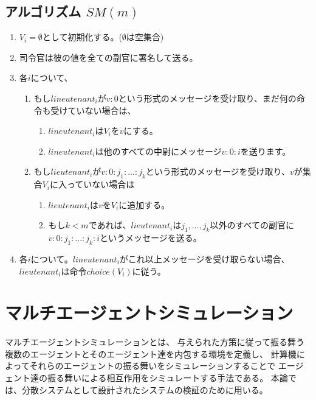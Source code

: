 \subsection{アルゴリズム $SM(m)$}
\begin{enumerate}
  \item $V_i=\emptyset$として初期化する。($\emptyset$は空集合)
  \item 司令官は彼の値を全ての副官に署名して送る。
  \item 各$i$について、 
  \begin{enumerate}
    \item もし$lineutenant_i$が$v:0$という形式のメッセージを受け取り、まだ何の命令も受けていない場合は、
    \begin{enumerate}
      \item $lineutenant_i$は$ V_i$を${v}$にする。 
      \item $lineutenant_i$は他のすべての中尉にメッセージ$v:0:i$を送ります。
    \end{enumerate}
    \item もし$lieutenant_i$が$v:0:j_1:...:j_k$という形式のメッセージを受け取り、$v$が集合$V_i$に入っていない場合は
    \begin{enumerate}
      \item $lieutenant_i$は$v$を$V_i$に追加する。
      \item もし$k<m$であれば、$lieutenant_i$は$j_1, ..., j_k$以外のすべての副官に$v:0:j_1:...:j_k:i$というメッセージを送る。
    \end{enumerate}
  \end{enumerate}
  \item 各$i$について。$lineutenant_i$がこれ以上メッセージを受け取らない場合、$lieutenant_i$は命令$choice(V_i)$に従う。
\end{enumerate}

\section{マルチエージェントシミュレーション}
マルチエージェントシミュレーションとは、
与えられた方策に従って振る舞う複数のエージェントとそのエージェント達を内包する環境を定義し、
計算機によってそれらのエージェントの振る舞いをシミュレーションすることで
エージェント達の振る舞いによる相互作用をシミュレートする手法である。
本論では、分散システムとして設計されたシステムの検証のために用いる。
